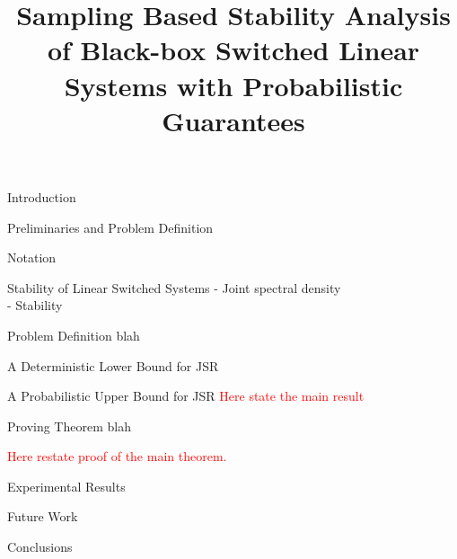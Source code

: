 \documentclass[letterpaper, 10 pt, conference]{ieeeconf}
\title{Sampling Based Stability Analysis of Black-box Switched Linear Systems with Probabilistic Guarantees}
\begin{document}
\maketitle

\begin{section}{Introduction}

\end{section}

\begin{section}{Preliminaries and Problem Definition}
\begin{subsection}{Notation}
 \\
\end{subsection}
\begin{subsection}{Stability of Linear Switched Systems}
- Joint spectral density \\
- Stability
\end{subsection}
\begin{subsection}{Problem Definition}
blah
\end{subsection}
\end{section}

\begin{section}{A Deterministic Lower Bound for JSR}

\end{section}

\begin{section}{A Probabilistic Upper Bound for JSR}
\textcolor{red}{Here state the main result}

\begin{subsection}{Proving Theorem blah}



\end{subsection}
\textcolor{red}{Here restate proof of the main theorem.}

\end{section}

\begin{section}{Experimental Results}

\end{section}

\begin{section}{Future Work}

\end{section}

\begin{section}{Conclusions}

\end{section}



\end{document}
